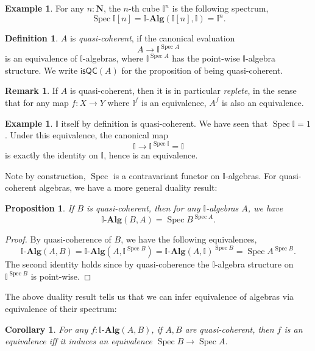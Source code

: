 \documentclass[12pt]{amsart}
\newtheorem{corollary}[theorem]{Corollary}
\newtheorem{proposition}[theorem]{Proposition}
\theoremstyle{definition}
\newtheorem{example}[theorem]{Example}
\newtheorem{definition}[theorem]{Definition}
\newtheorem{remark}[theorem]{Remark}
\newcommand{\mb}[1]{\mathbf{#1}}
\newcommand{\mbb}[1]{\mathbb{#1}}
\newcommand{\I}{\mbb I}
\newcommand{\ms}[1]{\mathsf{#1}}
\newcommand{\alg}{\text{-}\mb{Alg}}
\newcommand{\N}{\mb N}
\newcommand{\spec}{\operatorname{Spec}}
\begin{document}
\begin{example}\label{exm:cubeaffine}
  For any $n:\N$, the $n$-th cube $\I^n$ is the following spectrum,
  \[ \spec \I[n] = \I\alg(\I[n],\I) = \I^n. \]
\end{example}

\begin{definition}
  $A$ is \emph{quasi-coherent}, if the canonical evaluation
  \[ A \to \I^{\spec A} \]
  is an equivalence of $\I$-algebras, where $\I^{\spec A}$ has the point-wise $\I$-algebra structure. We write $\ms{isQC}(A)$ for the proposition of being quasi-coherent.
\end{definition}

\begin{remark}\label{rem:qcreplete}
  If $A$ is quasi-coherent, then it is in particular \emph{replete}, in the sense that for any map $f : X \to Y$ where $\I^f$ is an equivalence, $A^f$ is also an equivalence. 
\end{remark}

\begin{example}\label{exm:intervalqc}
  $\I$ itself by definition is quasi-coherent. We have seen that $\spec \I = 1$. Under this equivalence, the canonical map 
  \[ \I \to \I^{\spec \I} = \I \]
  is exactly the identity on $\I$, hence is an equivalence.
\end{example}

Note by construction, $\spec$ is a contravariant functor on $\I$-algebras. For quasi-coherent algebras, we have a more general duality result:

\begin{proposition}\label{prop:duality}
  If $B$ is quasi-coherent, then for any $\I$-algebras $A$, we have
  \[ \I\alg(B,A) = \spec B^{\spec A}. \]
\end{proposition}
\begin{proof}
  By quasi-coherence of $B$, we have the following equivalences,
  \[ \I\alg(A,B) = \I\alg(A,\I^{\spec B}) = \I\alg(A,\I)^{\spec B} = \spec A^{\spec B}. \]
  The second identity holds since by quasi-coherence the $\I$-algebra structure on $\I^{\spec B}$ is point-wise.
\end{proof}

The above duality result tells us that we can infer equivalence of algebras via equivalence of their spectrum:

\begin{corollary}\label{cor:dualityeqv}
  For any $f : \I\alg(A,B)$, if $A,B$ are quasi-coherent, then $f$ is an equivalence iff it induces an equivalence $\spec B \to \spec A$. 
\end{corollary}
\end{document}
